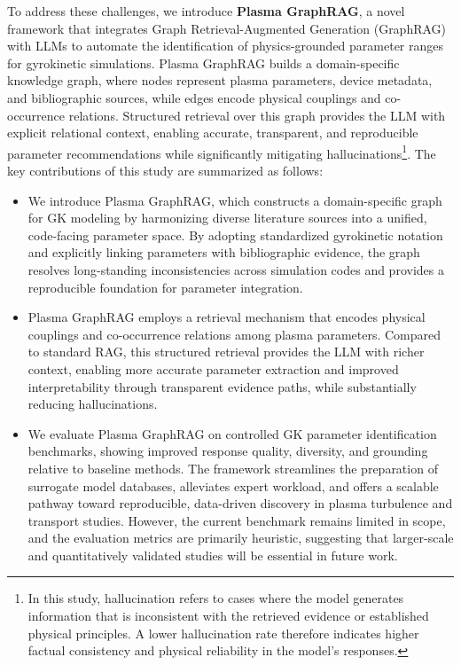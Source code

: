 \documentclass[journal]{IEEEtran}
\begin{document}
To address these challenges, we introduce \textbf{Plasma GraphRAG}, a novel framework that integrates Graph Retrieval-Augmented Generation (GraphRAG) with LLMs to automate the identification of physics-grounded parameter ranges for gyrokinetic simulations. Plasma GraphRAG builds a domain-specific knowledge graph, where nodes represent plasma parameters, device metadata, and bibliographic sources, while edges encode physical couplings and co-occurrence relations. Structured retrieval over this graph provides the LLM with explicit relational context, enabling accurate, transparent, and reproducible parameter recommendations while significantly mitigating hallucinations\footnote{In this study, hallucination refers to cases where the model generates information that is inconsistent with the retrieved evidence or established physical principles.
A lower hallucination rate therefore indicates higher factual consistency and physical reliability in the model’s responses.}. The key contributions of this study are summarized as follows:
\begin{itemize}
    \item  We introduce Plasma GraphRAG, which constructs a domain-specific graph for GK modeling by harmonizing diverse literature sources into a unified, code-facing parameter space. By adopting standardized gyrokinetic notation and explicitly linking parameters with bibliographic evidence, the graph resolves long-standing inconsistencies across simulation codes and provides a reproducible foundation for parameter integration.
    
    \item  Plasma GraphRAG employs a retrieval mechanism that encodes physical couplings and co-occurrence relations among plasma parameters. Compared to standard RAG, this structured retrieval provides the LLM with richer context, enabling more accurate parameter extraction and improved interpretability through transparent evidence paths, while substantially reducing hallucinations.
    
    \item  We evaluate Plasma GraphRAG on controlled GK parameter identification benchmarks, showing improved response quality, diversity, and grounding relative to baseline methods. The framework streamlines the preparation of surrogate model databases, alleviates expert workload, and offers a scalable pathway toward reproducible, data-driven discovery in plasma turbulence and transport studies. {However, the current benchmark remains limited in scope, and the evaluation metrics are primarily heuristic, suggesting that larger-scale and quantitatively validated studies will be essential in future work.}
\end{itemize}
\end{document}
